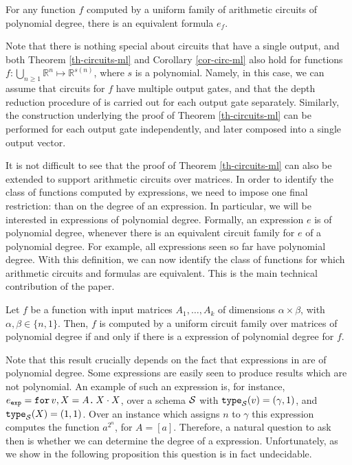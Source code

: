 \begin{corollary}
\label{cor-circ-ml}
For any function $f$ computed by a uniform family of arithmetic circuits of polynomial degree, there is an equivalent \langfor formula $e_f$.
\end{corollary}

Note that there is nothing special about circuits that have a single output, and both Theorem \ref{th-circuits-ml} and Corollary \ref{cor-circ-ml} also hold for functions  $f:\bigcup_{n\geq 1} \mathbb{R}^n\mapsto\mathbb{R}^{s(n)}$, where $s$ is a polynomial. Namely, in this case, we can assume that circuits for $f$ have multiple output gates, and that the depth reduction procedure of \cite{AllenderJMV98} is carried out for each output gate separately. Similarly, the construction underlying the proof of Theorem \ref{th-circuits-ml} can be performed for each output gate independently, and later composed into a single output vector.

It is not difficult to see that the proof of Theorem \ref{th-circuits-ml} can also be extended to support arithmetic circuits over matrices. In order to identify the class of functions computed by \langfor expressions, we need to impose one final restriction: than on the degree of an expression. 
In particular, we will be interested in \langfor expressions of polynomial degree. Formally, an expression $e$ is of polynomial degree, whenever there is an equivalent circuit family for $e$ of a polynomial degree.  
For example, all \langfor expressions seen so far have polynomial degree.
With this definition, we can now identify the class of functions for which arithmetic circuits and \langfor formulas are equivalent. This is the main technical contribution of the paper. 

\begin{corollary}
\label{th-equivalence}
Let $f$ be a function with input matrices $A_1,\ldots ,A_k$ of dimensions $\alpha\times \beta$, with $\alpha,\beta \in \{n,1\}$. Then, $f$ is computed by a uniform circuit family over matrices of polynomial degree if and only if there is a \langfor expression of polynomial degree for $f$. 
\end{corollary}

Note that this result crucially depends on the fact that expressions in \langfor are of polynomial degree.
Some \langfor expressions are easily seen to produce results which are not polynomial.
An example of such an expression is, for instance, $e_{\texttt{exp}} = \texttt{for}\, v,X=A \texttt{.}\, X\cdot X$, over a schema $\mathcal{S}$ with $\texttt{type}_{\mathcal{S}}(v)= (\gamma,1)$, and $\texttt{type}_{\mathcal{S}}(X)=(1,1)$.
Over an instance which assigns $n$ to $\gamma$ this expression computes the function $a^{2^n}$, for $A=[a]$.
Therefore, a natural question to ask then is whether we can determine the degree of a \langfor expression.
Unfortunately, as we show in the following proposition this question is in fact undecidable.

